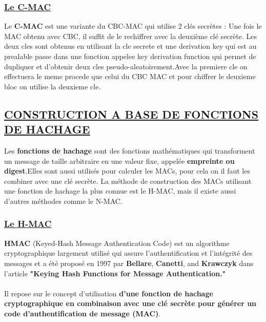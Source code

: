 \subsubsection{\textbf{\underline{Le C-MAC}}}

Le \textbf{C-MAC} est une variante du CBC-MAC qui utilise 2 clés secrètes : Une fois le MAC obtenu avec CBC, il suffit de le rechiffrer avec la deuxième clé secrète. Les deux cles sont obtenus en utilisant la cle secrete et une derivation key qui est au prealable passe dans une fonction appelee key derivation function qui permet de dupliquer et d'obtenir deux cles pseudo-aleatoirement.Avec la premiere cle on effectuera le meme procede que celui du CBC MAC et pour chiffrer le deuxieme bloc on utilise la deuxieme cle.

\newpage
\subsection{\textbf{\underline{CONSTRUCTION A BASE DE FONCTIONS DE HACHAGE}}}

Les \textbf{fonctions de hachage} sont des fonctions mathématiques qui transforment un message de taille arbitraire en une valeur fixe, appelée \textbf{empreinte ou digest}.Elles sont aussi utilisés pour calculer les MACs, pour cela on il faut les combiner avec une clé secrète. La méthode de construction des MACs utilisant une fonction de hachage la plus connue est le H-MAC, mais il existe aussi d'autres méthodes comme le N-MAC.

 \subsubsection{\textbf{\underline{Le H-MAC}}}

\textbf{HMAC} (Keyed-Hash Message Authentication Code) est un algorithme cryptographique largement utilisé qui assure l'authentification et l'intégrité des messages et a été proposé en 1997 par \textbf{Bellare}, \textbf{Canetti}, and \textbf{Krawczyk} dans l'article \textbf{"Keying Hash Functions for Message Authentication."}\\\\
Il repose sur le concept d'utilisation \textbf{d'une fonction de hachage cryptographique en combinaison avec une clé secrète pour générer un code d'authentification de message (MAC)}.\\

